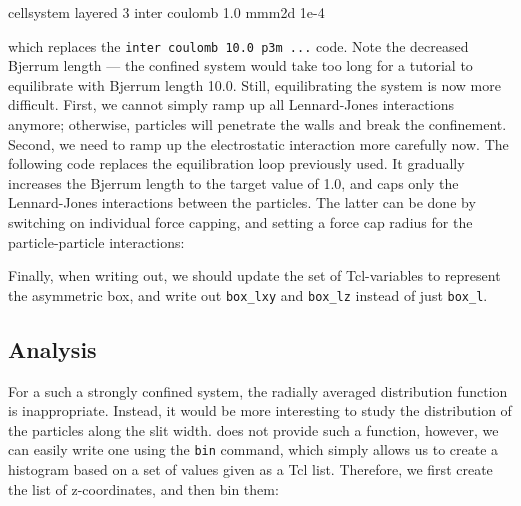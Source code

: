 \documentclass[
a4paper,                        %
11pt,                           %
twoside,                        %
footsepline,                    %
headsepline,                    %
headexclude,                    %
footexclude,                    %
pagesize,                       %
]{scrartcl}
\begin{document}
\begin{tclcode}
  cellsystem layered 3
  inter coulomb 1.0 mmm2d 1e-4  
\end{tclcode}

which replaces the \verb|inter coulomb 10.0 p3m ...| code. Note the
decreased Bjerrum length --- the confined system would take too long for
a tutorial to equilibrate with Bjerrum length 10.0. Still,
equilibrating the system is now more difficult. First, we cannot
simply ramp up all Lennard-Jones interactions anymore; otherwise,
particles will penetrate the walls and break the confinement. Second,
we need to ramp up the electrostatic interaction more carefully
now. The following code replaces the equilibration loop previously 
used. It gradually increases the Bjerrum length to the
target value of 1.0, and caps only the Lennard-Jones interactions
between the particles. The latter can be done by switching on
individual force capping, and setting a force cap radius for the
particle-particle interactions:


Finally, when writing out, we should update the set of
Tcl-variables to represent the asymmetric box, and write out
\verb|box_lxy| and \verb|box_lz| instead of just \verb|box_l|.

\subsection*{Analysis}

For a such a strongly confined system, the radially averaged
distribution function is inappropriate. Instead, it would be more
interesting to study the distribution of the particles along the slit
width. \es{}  does not provide such a function, however, we can easily
write one using the \verb|bin| command, which simply allows us 
to create a histogram based on a set of values given as a Tcl list.
Therefore, we first create the list
of z-coordinates, and then bin them:

\end{document}
